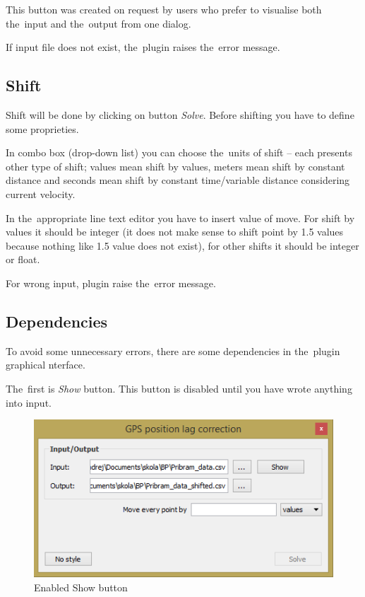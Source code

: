 This button was created on request by users who prefer to visualise both the~input and the~output from
one dialog. 

If input file does not exist, the~plugin raises the~error message. 

\subsection{Shift}
\label{shift}

Shift will be done by clicking on button \textit{Solve}.
Before shifting you have to define some proprieties. 

In combo box (drop-down list) you can choose the~units of
shift – each presents other type of shift; values mean shift
by values, meters mean shift by constant distance and seconds
mean shift by constant time/variable
distance considering current velocity. 

In the~appropriate line text editor you have to insert
value of move. For shift by values it should be integer (it
does not make sense to shift point by 1.5 values because
nothing like 1.5 value does not exist), for
other shifts it should be integer or float. 

For wrong input, plugin raise the~error message. 

\subsection{Dependencies}
\label{dependencies}

To avoid some unnecessary errors, there are some dependencies in the~plugin graphical nterface. 

The~first is \textit{Show} button. This button is
disabled until you have wrote anything into input. 

  \begin{figure}[H]
   \centering
	\includegraphics[scale=0.75]{./pictures/show.png}
	\caption[Enabled Show button]{Enabled Show button}
      \label{fig:show}
  \end{figure}

